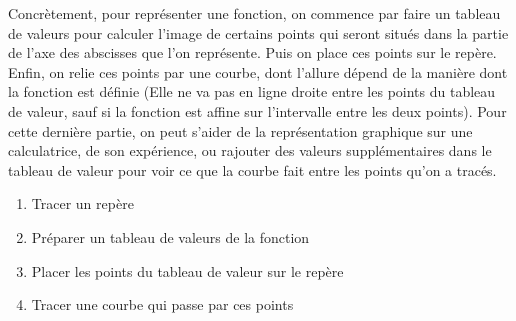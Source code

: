 \documentclass[10pt,a4paper]{book}
\begin{document}
    Concrètement, pour représenter une fonction, on commence par faire un tableau de valeurs pour calculer l'image de certains points qui seront situés dans la partie de l'axe des abscisses que l'on représente. Puis on place ces points sur le repère. Enfin, on relie ces points par une courbe, dont l'allure dépend de la manière dont la fonction est définie (Elle ne va pas en ligne droite entre les points du tableau de valeur, sauf si la fonction est affine sur l'intervalle entre les deux points). Pour cette dernière partie, on peut s'aider de la représentation graphique sur une calculatrice, de son expérience, ou rajouter des valeurs supplémentaires dans le tableau de valeur pour voir ce que la courbe fait entre les points qu'on a tracés.
    \begin{enumerate}
        \item Tracer un repère
        \item Préparer un tableau de valeurs de la fonction
        \item Placer les points du tableau de valeur sur le repère
        \item Tracer une courbe qui passe par ces points
    \end{enumerate}

    \begin{minipage}{0.475\textwidth}
\end{minipage}
\begin{minipage}{0.475\textwidth}
  \end{minipage}
\end{document}
